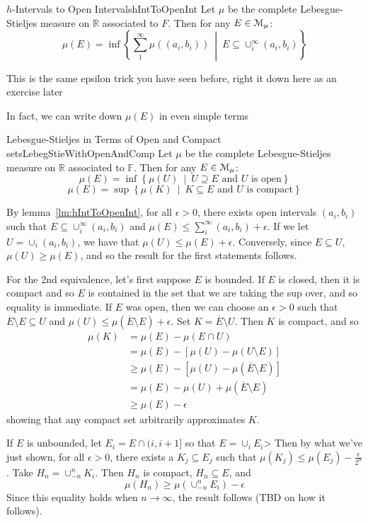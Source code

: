 \documentclass[oneside]{book}
\newcommand{\R}{\mathbb{R}}
\newcommand{\F}{\mathbb{F}}
\newcommand{\MM}{\EuScript{M}}
\newcommand{\sse}{\subseteq}
\newcommand{\set}[2]{\left\{#1 \ \middle|\ #2\right\}}
\newcommand{\oln}{\overline}
\newcommand{\rw}{\rightarrow}
\begin{document}
\begin{lem}{$h$-Intervals to Open Intervals}{hIntToOpenInt}
	Let $\mu$ be the complete Lebesgue-Stieljes measure on $\R$ associated to $F$. Then for any $E \in \MM_\mu$:
	\[
		\mu(E) = \inf \set{\sum_1^\infty \mu((a_i, b_i))}{E \sse \cup_i^\infty (a_i, b_i)}
\]
\end{lem}


\begin{Proof}
	This is the same epsilon trick you have seen before, right it down here as an exercise later
\end{Proof}


In fact, we can write down $\mu(E)$ in even simple terms


\begin{thm}{Lebesgue-Stieljes in Terms of Open and Compact sets}{LebegStieWithOpenAndComp}
	Let $\mu$ be the complete Lebesgue-Stieljes measure on $\R$ associated to $\F$. Then for any $E \in \MM_\mu$:
	\[
		\mu(E) = \inf \set{\mu(U)}{U \supseteq E\text{ and $U$ is open}}
	\]
	\[
		\mu(E) = \sup \set{\mu(K)}{K \sse E\text{ and $U$ is compact}}
	\]
\end{thm}

\begin{Proof}
	By lemma~\ref{lm:hIntToOpenInt}, for all $\epsilon > 0$, there exists open intervals $(a_i, b_i)$ such that $E \sse
	\cup_i^\infty (a_i,b_i)$ and $\mu(E) \le \sum_i^\infty (a_i, b_i) + \epsilon$. If we let $U = \cup_i (a_i, b_i)$, we
	have that $\mu(U) \le \mu(E) + \epsilon$. Conversely, since $E \sse U$, $\mu(U) \ge \mu(E)$, and so the result for
	the first statements follows. 

	For the 2nd equivalence, let's first suppose $E$ is bounded. If $E$ is closed, then it is compact and so $E$ is
	contained in the set that we are taking the sup over, and so equality is immediate. If $E$ was open, then we can
	choose an $\epsilon > 0$ such that $\oln{E}\setminus E \sse U$ and $\mu(U) \le \mu(\oln{E}\setminus E) + \epsilon$.
	Set $K = \oln{E}\setminus U$. Then $K$ is compact, and so
	\begin{align*}
		\mu(K) &= \mu(E) - \mu(E\cap U)\\
			   &= \mu(E) - [\mu(U) - \mu(U\setminus E)]\\
			   &\ge \mu(E) - [\mu(U) - \mu(\oln{E}\setminus E)]\\
			   &= \mu(E) - \mu(U) + \mu(\oln{E}\setminus E)\\
			   &\ge \mu(E) - \epsilon
	\end{align*}
	showing that any compact set arbitrarily approximates $K$.  

	If $E$ is unbounded, let $E_i = E\cap (i, i+1]$ so that $E=  \cup_i E_i$> Then by what we've just shown, for all
	$\epsilon > 0$, there exists a $K_j \sse E_j$ such that $\mu(K_j) \le \mu(E_j) - \frac{\epsilon}{2^n}$. Take $H_n
	= \cup_{-n}^n K_i$. Then $H_n$ is compact, $H_n \sse E$, and 
	\[
		\mu(H_n) \ge \mu(\cup_{-n}^n E_i) - \epsilon
	\]
	Since this equality holds when $n \rw \infty$, the result follows (TBD on how it follows). 
\end{Proof}
\end{document}
